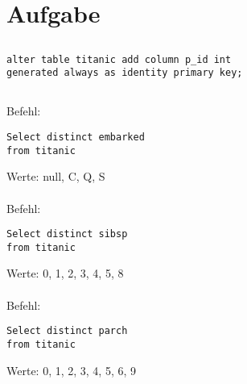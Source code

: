 \documentclass[a4paper,11pt,titlepage]{article}
\begin{document}
\section{Aufgabe}
\subsection{}
\begin{verbatim}
alter table titanic add column p_id int
generated always as identity primary key;
\end{verbatim}
\subsection{}
Befehl:
\begin{verbatim}
Select distinct embarked 
from titanic
\end{verbatim}
Werte: null, C, Q, S\\
\\
Befehl:
\begin{verbatim}
Select distinct sibsp
from titanic
\end{verbatim}
Werte:	0, 1, 2, 3, 4, 5, 8\\
\\
Befehl:
\begin{verbatim}
Select distinct parch
from titanic
\end{verbatim}
Werte:	0, 1, 2, 3, 4, 5, 6, 9
\end{document}
